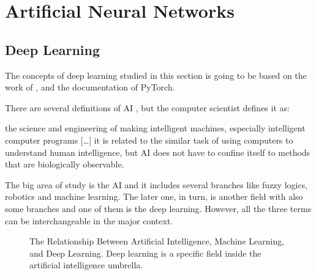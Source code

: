\section{Artificial Neural Networks}\label{sec:ann}

\subsection{Deep Learning}\label{sec:deep_learning}

The concepts of deep learning studied in this section is going to be based on the work of \textcite{goodfellow2016}, \textcite{haykin1999} and the documentation of PyTorch.

There are several definitions of AI \cite{winston1992}, but the  computer scientist \textcite{mccarthy2007} defines it as:
%
\begin{citacao}[english]
    [\ldots] the science and engineering of making intelligent machines, especially intelligent computer programs [\ldots] it is related to the similar task of using computers to understand human intelligence, but AI does not have to confine itself to methods that are biologically observable.
\end{citacao}
The big area of study is the AI and it includes several branches like fuzzy logics, robotics and machine learning.
The later one, in turn, is another field with also some branches and one of them is the deep learning.
However, all the three terms can be interchangeable in the major context.

\begin{figure}[!htb]
    \centering
    \caption[The Relationship Between Artificial Intelligence, Machine Learning, and Deep Learning.]{The Relationship Between Artificial Intelligence, Machine Learning, and Deep Learning. Deep learning is a specific field inside the artificial intelligence umbrella.}
    
\end{figure}


